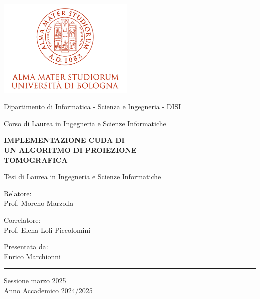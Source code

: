 \documentclass[12pt,a4paper]{report}
\begin{document}
\begin{spacing}{1.5}
\begin{titlepage}

\begin{center}

\includegraphics[width=6.5cm,height=4.7cm]{marchio-di-ateneo}

\vspace{4mm}

{Dipartimento di Informatica - Scienza e Ingegneria - DISI} 

\vspace{2mm}

{\large{Corso di Laurea in Ingegneria e Scienze Informatiche}}

\vspace{10mm}

{\huge{\bf{IMPLEMENTAZIONE CUDA DI}}}\\
\vspace{3mm}
{\huge{\bf{UN ALGORITMO DI PROIEZIONE}}}\\
\vspace{3mm}
{\huge{\bf{TOMOGRAFICA}}}\\
\vspace{3mm}

\vspace{5mm}
{Tesi di Laurea in Ingegneria e Scienze Informatiche}

\end{center}

\vspace{10mm}

\noindent\begin{minipage}[t]{0.40\textwidth}
{\large{Relatore: \\ Prof. Moreno Marzolla}}

\vspace{3mm}

{\large{Correlatore: \\ Prof. Elena Loli Piccolomini}}
\end{minipage}
\hfill
\begin{minipage}[t]{0.40\textwidth}\raggedleft
{\large{Presentata da: \\ Enrico Marchionni}}
\end{minipage}

\vfill

\hrule height 0.6mm

\begin{center}
{Sessione marzo 2025\\}
{Anno Accademico 2024/2025\\}
\end{center}

\end{titlepage}
\end{spacing}
\end{document}
